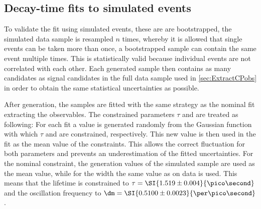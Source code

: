 \subsection{Decay-time fits to simulated events}
\label{sec:valOnSim}

To validate the fit using simulated events, these are are bootstrapped, \ie the simulated data sample is resampled $n$ times, whereby it is allowed that single events can be taken more than once, \eg a bootstrapped sample can contain the same event multiple times.
This is statistically valid because individual events are not correlated with each other.
Each generated sample then contains as many candidates as signal candidates in the full \BdToDpi data sample used in \cref{sec:ExtractCPobs} in order to obtain the same statistical uncertainties as possible.

After generation, the samples are fitted with the same strategy as the nominal fit extracting the \CP observables.
The constrained parameters $\tau$ and \dm are treated as following:
For each fit a value is generated randomly from the Gaussian function with which $\tau$ and \dm are constrained, respectively.
This new value is then used in the fit as the mean value of the constraints.
This allows the correct fluctuation for both parameters and prevents an underestimation of the fitted uncertainties.
For the nominal constraint, the generation values of the simulated sample are used as the mean value, while for the width the same value as on data is used.
This means that the lifetime is constrained to $\tau=\SI{1.519\pm0.004}{\pico\second}$ and the oscillation frequency to $\dm=\SI{0.5100\pm0.0023}{\per\pico\second}$.

